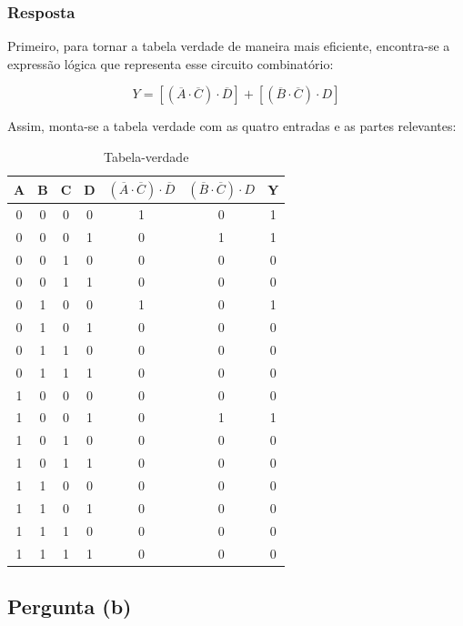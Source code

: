 \documentclass[12pt]{article}
\begin{document}
\subsubsection*{Resposta}

Primeiro, para tornar a tabela verdade de maneira mais eficiente, encontra-se a expressão lógica que representa esse circuito combinatório:

\begin{equation}
Y = [(\overline{A} \cdot \overline{C}) \cdot \overline{D}] + [(\overline{B} \cdot \overline{C}) \cdot D]
\label{equação lógica 1}
\end{equation}

Assim, monta-se a tabela verdade com as quatro entradas e as partes relevantes:

\begin{table}[H]
\caption{Tabela-verdade}
\centering
\renewcommand{\arraystretch}{1.3}
\begin{tabular}{|c|c|c|c|c|c|c|}
    \hline
    A & B & C & D & $(\overline{A} \cdot \overline{C}) \cdot \overline{D}$ & $(\overline{B} \cdot \overline{C}) \cdot D$  & Y\\
    \hline
    0 & 0 & 0 & 0 & 1 & 0 & 1 \\
0 & 0 & 0 & 1 & 0 & 1 & 1 \\
0 & 0 & 1 & 0 & 0 & 0 & 0 \\
0 & 0 & 1 & 1 & 0 & 0 & 0 \\
0 & 1 & 0 & 0 & 1 & 0 & 1 \\
0 & 1 & 0 & 1 & 0 & 0 & 0 \\
0 & 1 & 1 & 0 & 0 & 0 & 0 \\
0 & 1 & 1 & 1 & 0 & 0 & 0 \\
1 & 0 & 0 & 0 & 0 & 0 & 0 \\
1 & 0 & 0 & 1 & 0 & 1 & 1 \\
1 & 0 & 1 & 0 & 0 & 0 & 0 \\
1 & 0 & 1 & 1 & 0 & 0 & 0 \\
1 & 1 & 0 & 0 & 0 & 0 & 0 \\
1 & 1 & 0 & 1 & 0 & 0 & 0 \\
1 & 1 & 1 & 0 & 0 & 0 & 0 \\
1 & 1 & 1 & 1 & 0 & 0 & 0 \\
\hline
\end{tabular}
\end{table}

\subsection{Pergunta (b)}
\end{document}
